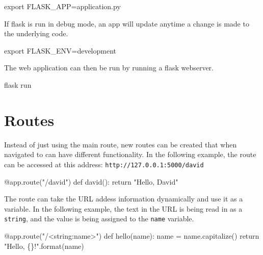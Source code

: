\documentclass[]{book}
\newenvironment{Shaded}{\begin{snugshade}}{\end{snugshade}}
\newcommand{\BuiltInTok}[1]{#1}
\newcommand{\ExtensionTok}[1]{#1}
\newcommand{\NormalTok}[1]{#1}
\newcommand{\StringTok}[1]{\textcolor[rgb]{0.31,0.60,0.02}{#1}}
\newcommand{\VariableTok}[1]{\textcolor[rgb]{0.00,0.00,0.00}{#1}}
\begin{document}
\begin{Shaded}
\begin{Highlighting}[]
\BuiltInTok{export} \VariableTok{FLASK_APP=}\NormalTok{application.py}
\end{Highlighting}
\end{Shaded}

If flask is run in debug mode, an app will update anytime a change is made to the underlying code.

\begin{Shaded}
\begin{Highlighting}[]
\BuiltInTok{export} \VariableTok{FLASK_ENV=}\NormalTok{development}
\end{Highlighting}
\end{Shaded}

The web application can then be run by running a flask webserver.

\begin{Shaded}
\begin{Highlighting}[]
\ExtensionTok{flask}\NormalTok{ run}
\end{Highlighting}
\end{Shaded}

\hypertarget{routes}{%
\section{Routes}\label{routes}}

Instead of just using the main route, new routes can be created that when navigated to can have different functionality. In the following example, the route can be accessed at this address: \texttt{http://127.0.0.1:5000/david}

\begin{Shaded}
\begin{Highlighting}[]
\ExtensionTok{@app.route}\NormalTok{(}\StringTok{"/david"}\NormalTok{)}
\ExtensionTok{def}\NormalTok{ david()}\BuiltInTok{:}
    \BuiltInTok{return} \StringTok{"Hello, David"}
\end{Highlighting}
\end{Shaded}

The route can take the URL addess information dynamically and use it as a variable. In the following example, the text in the URL is being read in as a \texttt{string}, and the value is being assigned to the \texttt{name} variable.

\begin{Shaded}
\begin{Highlighting}[]
\ExtensionTok{@app.route}\NormalTok{(}\StringTok{"/<string:name>"}\NormalTok{)}
\ExtensionTok{def}\NormalTok{ hello(name)}\BuiltInTok{:}
    \ExtensionTok{name}\NormalTok{ = name.capitalize()}
    \BuiltInTok{return} \StringTok{"Hello, \{\}!"}\NormalTok{.format(name)}
\end{Highlighting}
\end{Shaded}
\end{document}
